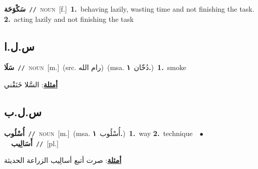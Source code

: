 \documentclass[10pt,a4paper,twoside]{article} %
\begin{document}
\begin{multicols}{2}
{\setlength\topsep{0pt}\textbf{\foreignlanguage{arabic}{سَكْوَحَة}}\ {\color{gray}\texttt{//}\color{black}}\ \textsc{noun}\ [f.]\ \textbf{1.}~behaving lazily, wasting time and not finishing the task.  \textbf{2.}~acting lazily and not finishing the task\ } \vspace{2mm}

\vspace{-3mm}
\subsection*{\color{blue}\foreignlanguage{arabic}{س.ل.ا}\color{blue}{ (ntws)}} 

{\setlength\topsep{0pt}\textbf{\foreignlanguage{arabic}{سَلَا}}\ {\color{gray}\texttt{//}\color{black}}\ \textsc{noun}\ [m.]\ (src. \color{gray}\foreignlanguage{arabic}{رام الله}\color{black})\ \color{gray}(msa. \foreignlanguage{arabic}{دُخّان}~\foreignlanguage{arabic}{\textbf{١.}})\color{black}\ \textbf{1.}~smoke\  \begin{flushright}\color{gray}\foreignlanguage{arabic}{\textbf{\underline{\foreignlanguage{arabic}{أمثلة}}}: السَّلا خَنَقْني}\end{flushright}\color{black}} \vspace{2mm}

\vspace{-3mm}
\subsection*{\color{blue}\foreignlanguage{arabic}{س.ل.ب}\color{blue}{}} 

{\setlength\topsep{0pt}\textbf{\foreignlanguage{arabic}{أُسْلُوب}}\ {\color{gray}\texttt{//}\color{black}}\ \textsc{noun}\ [m.]\ \color{gray}(msa. \foreignlanguage{arabic}{أُسْلُوب}~\foreignlanguage{arabic}{\textbf{١.}})\color{black}\ \textbf{1.}~way  \textbf{2.}~technique\ \ $\bullet$\ \ \setlength\topsep{0pt}\textbf{\foreignlanguage{arabic}{أَسَالِيب}}\ {\color{gray}\texttt{//}\color{black}}\ [pl.]\  \begin{flushright}\color{gray}\foreignlanguage{arabic}{\textbf{\underline{\foreignlanguage{arabic}{أمثلة}}}: صرت أتبع أسالِيب الزراعة الحديثة}\end{flushright}\color{black}} \vspace{2mm}


\end{multicols}
\end{document}
